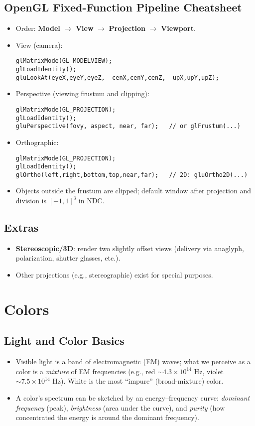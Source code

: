 \documentclass[10pt,twocolumn]{extarticle}
\begin{document}
\subsection*{OpenGL Fixed-Function Pipeline Cheatsheet}
\begin{itemize}
  \item Order: \textbf{Model} \(\rightarrow\) \textbf{View} \(\rightarrow\) \textbf{Projection} \(\rightarrow\) \textbf{Viewport}.
  \item View (camera): 
\begin{verbatim}
glMatrixMode(GL_MODELVIEW);
glLoadIdentity();
gluLookAt(eyeX,eyeY,eyeZ,  cenX,cenY,cenZ,  upX,upY,upZ);
\end{verbatim}
  \item Perspective (viewing frustum and clipping):
\begin{verbatim}
glMatrixMode(GL_PROJECTION);
glLoadIdentity();
gluPerspective(fovy, aspect, near, far);   // or glFrustum(...)
\end{verbatim}
  \item Orthographic:
\begin{verbatim}
glMatrixMode(GL_PROJECTION);
glLoadIdentity();
glOrtho(left,right,bottom,top,near,far);   // 2D: gluOrtho2D(...)
\end{verbatim}
  \item Objects outside the frustum are clipped; default window after projection and division is \([-1,1]^3\) in NDC.
\end{itemize}

\subsection*{Extras}
\begin{itemize}
  \item \textbf{Stereoscopic/3D}: render two slightly offset views (delivery via anaglyph, polarization, shutter glasses, etc.).
  \item Other projections (e.g., stereographic) exist for special purposes.
\end{itemize}
\section{Colors}

\subsection*{Light and Color Basics}
\begin{itemize}
  \item Visible light is a band of electromagnetic (EM) waves; what we perceive as a color is a \emph{mixture} of EM frequencies (e.g., red $\sim 4.3\times10^{14}$ Hz, violet $\sim 7.5\times10^{14}$ Hz). White is the most ``impure'' (broad-mixture) color.
  \item A color’s spectrum can be sketched by an energy–frequency curve: \emph{dominant frequency} (peak), \emph{brightness} (area under the curve), and \emph{purity} (how concentrated the energy is around the dominant frequency).
\end{itemize}
\end{document}
